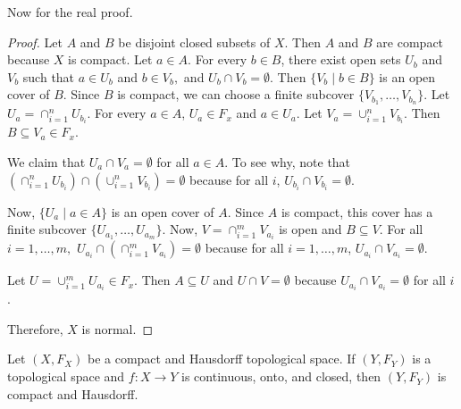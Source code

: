 Now for the real proof.
\begin{proof}
	Let $A$ and $B$ be disjoint closed subsets of $X$. Then $A$ and $B$ are compact because $X$ is compact. Let $a \in A$. For every $b \in B$, there exist open sets $U_b$ and $V_b$ such that $a \in U_b$ and $b \in V_b,$ and $U_b \cap V_b = \emptyset.$ Then $\{V_b \mid b \in B\}$ is an open cover of $B$. Since $B$ is compact, we can choose a finite subcover $\{V_{b_1},\ldots,V_{b_n}\}.$ Let $U_a=\cap_{i=1}^n U_{b_i}$. For every $a \in A$, $U_a \in F_x$ and $a \in U_a.$ Let $V_a=\cup_{i=1}^n V_{b_i}$. Then $B \subseteq V_a \in F_x$. 
	
	We claim that $U_a \cap V_a = \emptyset$ for all $a \in A$. To see why, note that $\left( \cap_{i=1}^n U_{b_i}\right) \cap \left( \cup_{i=1}^n V_{b_i} \right) = \emptyset$ because for all $i$, $U_{b_i} \cap V_{b_i}=\emptyset.$
	
	Now, $\{U_a \mid a \in A\}$ is an open cover of $A$. Since $A$ is compact, this cover has a finite subcover $\{U_{a_1},\ldots,U_{a_m}\}$. Now, $V=\cap_{i=1}^{m}V_{a_i}$ is open and $B \subseteq V$. For all $i=1,\ldots,m,$ $U_{a_i}\cap \left( \cap_{i=1}^m V_{a_i} \right) = \emptyset$ because for all $i=1,\ldots,m$, $U_{a_i} \cap V_{a_i}=\emptyset$. 
	
	Let $U=\cup_{i=1}^m U_{a_i} \in F_x$. Then $A \subseteq U$ and $U \cap V = \emptyset$ because $U_{a_i} \cap V_{a_i}=\emptyset$ for all $i$.
	
	Therefore, $X$ is normal. 
\end{proof}
\begin{theorem}
	Let $(X,F_X)$ be a compact and Hausdorff topological space. If $(Y,F_Y)$ is a topological space and $f : X \to Y$ is continuous, onto, and closed, then $(Y,F_Y)$ is compact and Hausdorff. 
\end{theorem}
